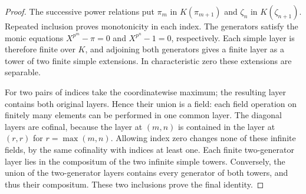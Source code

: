 \begin{proof}
The successive power relations put $\pi_m$ in $K(\pi_{m+1})$ and
$\zeta_n$ in $K(\zeta_{n+1})$. Repeated inclusion proves monotonicity
in each index. The generators satisfy the monic equations
$X^{p^m}-\pi=0$ and $X^{p^n}-1=0$, respectively. Each simple layer
is therefore finite over $K$, and adjoining both generators gives a
finite layer as a tower of two finite simple extensions. In
characteristic zero these extensions are separable.

For two pairs of indices take the coordinatewise maximum; the resulting
layer contains both original layers. Hence their union is a field:
each field operation on finitely many elements can be performed in one
common layer. The diagonal layers are cofinal, because the layer at
$(m,n)$ is contained in the layer at $(r,r)$ for $r=\max(m,n)$.
Allowing index zero changes none of these infinite fields, by the same
cofinality with indices at least one. Each finite two-generator layer
lies in the compositum of the two infinite simple towers. Conversely,
the union of the two-generator layers contains every generator of both
towers, and thus their compositum. These two inclusions prove the final
identity.
\end{proof}

